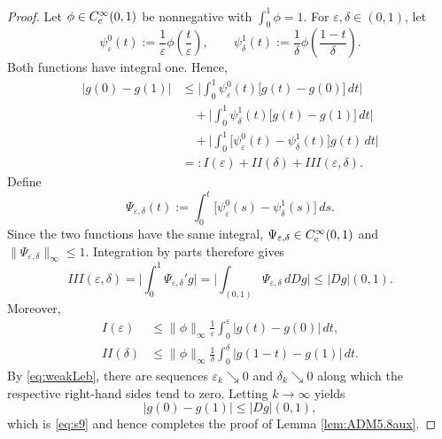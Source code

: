 \documentclass[11pt]{amsart}
\theoremstyle{definition}
\theoremstyle{remark}
\numberwithin{equation}{section}
\newcommand{\abs}[1]{|#1|}
\newcommand{\Babs}[1]{\Big|#1\Big|}
\newcommand{\Norm}[2]{\|#1\|_{#2}}
\begin{document}
\begin{proof}
Let $\phi\in C_{\rm c}^\infty(0,1)$ be nonnegative with
$\int_0^1\phi=1$. For $\varepsilon,\delta\in(0,1)$, let
\begin{equation*}
 \psi^0_\varepsilon(t)
 :=\frac{1}{\varepsilon}\phi\left(\frac{t}{\varepsilon}\right),
 \qquad
 \psi^1_\delta(t)
 :=\frac{1}{\delta}\phi\left(\frac{1-t}{\delta}\right).
\end{equation*}
Both functions have integral one. Hence,
\begin{align*}
 \abs{g(0)-g(1)}
 &\leq \Babs{\int_0^1\psi^0_\varepsilon(t)
   \bigl[g(t)-g(0)\bigr]\,dt}\\
 &\quad+\Babs{\int_0^1\psi^1_\delta(t)
   \bigl[g(t)-g(1)\bigr]\,dt}\\
 &\quad+\Babs{\int_0^1
   \bigl[\psi^0_\varepsilon(t)-\psi^1_\delta(t)\bigr]g(t)\,dt}\\
 &=:I(\varepsilon)+II(\delta)+III(\varepsilon,\delta).
\end{align*}
Define
\begin{equation*}
 \Psi_{\varepsilon,\delta}(t)
 :=\int_0^t\bigl[\psi^0_\varepsilon(s)
                 -\psi^1_\delta(s)\bigr]\,ds.
\end{equation*}
Since the two functions have the same integral,
$\Psi_{\varepsilon,\delta}\in C_{\rm c}^\infty(0,1)$ and
$\Norm{\Psi_{\varepsilon,\delta}}{\infty}\leq1$. Integration by parts
therefore gives
\begin{equation*}
 III(\varepsilon,\delta)
 =\Babs{\int_0^1\Psi_{\varepsilon,\delta}'g}
 =\Babs{\int_{(0,1)}\Psi_{\varepsilon,\delta}\,dDg}
 \leq\abs{Dg}(0,1).
\end{equation*}
Moreover,
\begin{align*}
 I(\varepsilon)
 &\leq\Norm{\phi}{\infty}\frac{1}{\varepsilon}
 \int_0^\varepsilon\abs{g(t)-g(0)}\,dt,\\
 II(\delta)
 &\leq\Norm{\phi}{\infty}\frac{1}{\delta}
 \int_0^\delta\abs{g(1-t)-g(1)}\,dt.
\end{align*}
By \eqref{eq:weakLeb}, there are sequences
$\varepsilon_k\searrow 0$ and $\delta_k\searrow 0$ along which the respective
right-hand sides tend to zero. Letting $k\to\infty$ yields
\begin{equation*}
 \abs{g(0)-g(1)}\leq\abs{Dg}(0,1),
\end{equation*}
which is \eqref{eq:s9} and hence completes the proof of Lemma \ref{lem:ADM5.8aux}.
\end{proof}
\end{document}
